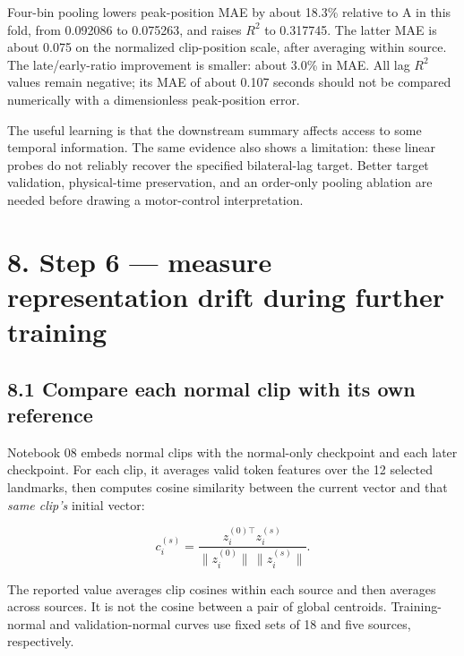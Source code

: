 \documentclass[11pt,letterpaper]{article}
\begin{document}
Four-bin pooling lowers peak-position MAE by about 18.3\% relative to A
in this fold, from 0.092086 to 0.075263, and raises \(R^2\) to 0.317745.
The latter MAE is about 0.075 on the normalized clip-position scale,
after averaging within source. The late/early-ratio improvement is
smaller: about 3.0\% in MAE. All lag \(R^2\) values remain negative; its
MAE of about 0.107 seconds should not be compared numerically with a
dimensionless peak-position error.

The useful learning is that the downstream summary affects access to
some temporal information. The same evidence also shows a limitation:
these linear probes do not reliably recover the specified bilateral-lag
target. Better target validation, physical-time preservation, and an
order-only pooling ablation are needed before drawing a motor-control
interpretation.

\section{8. Step 6 --- measure representation drift during further
training}\label{step-6-measure-representation-drift-during-further-training}

\subsection{8.1 Compare each normal clip with its own
reference}\label{compare-each-normal-clip-with-its-own-reference}

Notebook 08 embeds normal clips with the normal-only checkpoint and each
later checkpoint. For each clip, it averages valid token features over
the 12 selected landmarks, then computes cosine similarity between the
current vector and that \emph{same clip's} initial vector:

\[
c_i^{(s)}=
\frac{z_i^{(0)\top}z_i^{(s)}}
{\|z_i^{(0)}\|\,\|z_i^{(s)}\|}.
\]

The reported value averages clip cosines within each source and then
averages across sources. It is not the cosine between a pair of global
centroids. Training-normal and validation-normal curves use fixed sets
of 18 and five sources, respectively.
\end{document}
